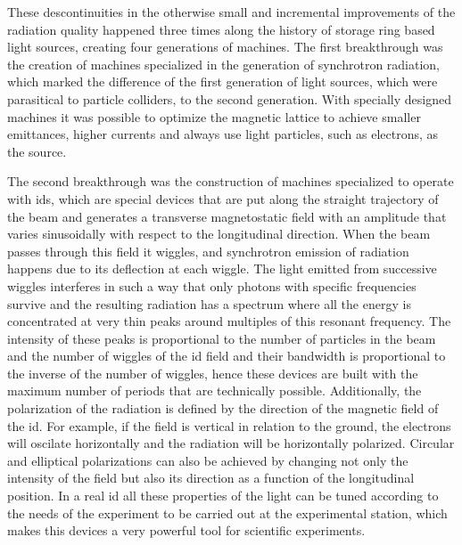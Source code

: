     These descontinuities in the otherwise small and incremental improvements of the radiation quality happened three times along the history of storage ring based light sources, creating four generations of machines. The first breakthrough was the creation of machines specialized in the generation of synchrotron radiation, which marked the difference of the first generation of light sources, which were parasitical to particle colliders, to the second generation. With specially designed machines it was possible to optimize the magnetic lattice to achieve smaller emittances, higher currents and always use light particles, such as electrons, as the source.

    The second breakthrough was the construction of machines specialized to operate with \gls{ids}, which are special devices that are put along the straight trajectory of the beam and generates a transverse magnetostatic field with an amplitude that varies sinusoidally with respect to the longitudinal direction. When the beam passes through this field it wiggles, and synchrotron emission of radiation happens due to its deflection at each wiggle. The light emitted from successive wiggles interferes in such a way that only photons with specific frequencies survive and the resulting radiation has a spectrum where all the energy is concentrated at very thin peaks around multiples of this resonant frequency. The intensity of these peaks is proportional to the number of particles in the beam and the number of wiggles of the \gls{id} field and their bandwidth is proportional to the inverse of the number of wiggles, hence these devices are built with the maximum number of periods that are technically possible. Additionally, the polarization of the radiation is defined by the direction of the magnetic field of the \gls{id}. For example, if the field is vertical in relation to the ground, the electrons will oscilate horizontally and the radiation will be horizontally polarized. Circular and elliptical polarizations can also be achieved by changing not only the intensity of the field but also its direction as a function of the longitudinal position. In a real \gls{id} all these properties of the light can be tuned according to the needs of the experiment to be carried out at the experimental station, which makes this devices a very powerful tool for scientific experiments.

